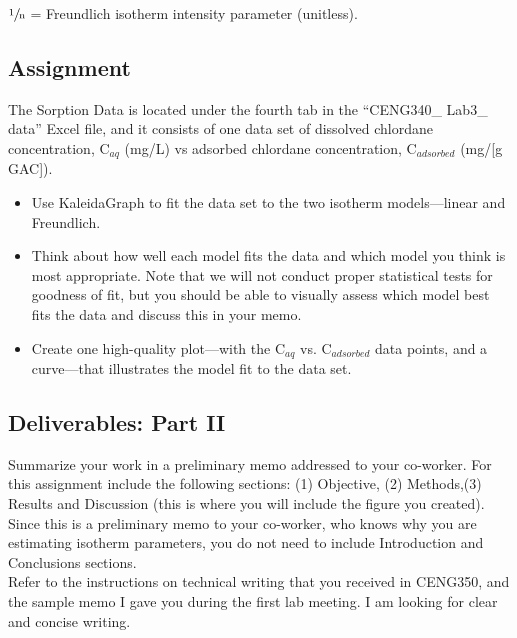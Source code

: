 \documentclass[12pt,letterpaper]{article}
\begin{document}
$\mathrm{\sfrac{1}{n}}$ = Freundlich isotherm intensity parameter (unitless).\\

\subsection *{Assignment}

The Sorption Data is located under the fourth tab in the ``CENG340\_ Lab3\_ data'' Excel file, and it consists of one data set of dissolved chlordane concentration, C$_{aq}$ (mg/L) vs adsorbed chlordane concentration, C$_{adsorbed}$ (mg/[g GAC]).

\begin{itemize} 
\item Use KaleidaGraph to fit the data set to  the two isotherm models---linear and Freundlich.  

\item Think about how well each model fits the data and which model you think is most  appropriate. Note that we will not conduct proper statistical tests for goodness of fit, but you should be able to visually assess which model best fits the data and discuss this in your memo.
\item Create one high-quality plot---with the C$_{aq}$ vs. C$_{adsorbed}$ data points, and a curve---that illustrates the model fit to the data set.
 

 
\end{itemize}


\subsection *{Deliverables: Part II}
Summarize your work in a preliminary memo addressed to your co-worker. For this assignment include the following sections: (1) Objective, (2) Methods,(3) Results and Discussion (this is where you will include the figure you created).  Since this is a preliminary memo to your co-worker, who knows why you are estimating isotherm parameters, you do not need to include Introduction and Conclusions sections.\\

Refer to the instructions on technical writing that you received in CENG350, and the sample memo I gave you during the first lab meeting.  I am looking for clear and concise writing.\\
\end{document}
